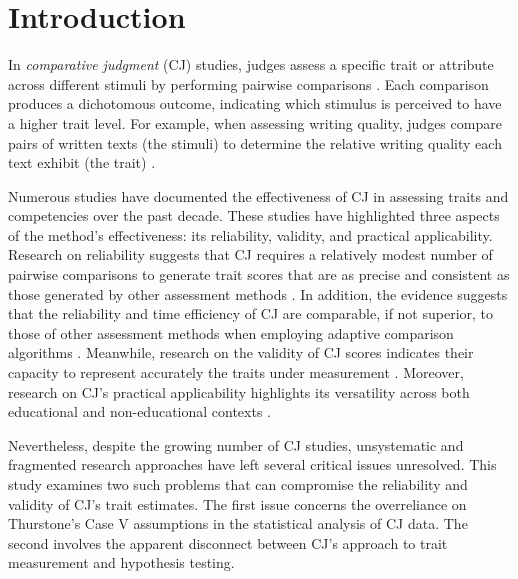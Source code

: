 \documentclass[
  authoryear,
  review,
  1p]{elsarticle}
\begin{document}
\newcommand{\dsep}{\:\bot\:}
\newcommand{\ndsep}{\:\not\bot\:}
\newcommand{\cond}{\:|\:}

\section{Introduction}\label{sec-introduction}

In \emph{comparative judgment} (CJ) studies, judges assess a specific
trait or attribute across different stimuli by performing pairwise
comparisons \citep{Thurstone_1927a, Thurstone_1927b}. Each comparison
produces a dichotomous outcome, indicating which stimulus is perceived
to have a higher trait level. For example, when assessing writing
quality, judges compare pairs of written texts (the stimuli) to
determine the relative writing quality each text exhibit (the trait)
\citep{Laming_2004, Pollitt_2012b, Whitehouse_2012, vanDaal_et_al_2016, Lesterhuis_2018_thesis, Coertjens_et_al_2017, Goossens_et_al_2018, Bouwer_et_al_2023}.

Numerous studies have documented the effectiveness of CJ in assessing
traits and competencies over the past decade. These studies have
highlighted three aspects of the method's effectiveness: its
reliability, validity, and practical applicability. Research on
reliability suggests that CJ requires a relatively modest number of
pairwise comparisons \citep{Verhavert_et_al_2019, Crompvoets_et_al_2022}
to generate trait scores that are as precise and consistent as those
generated by other assessment methods
\citep{Coertjens_et_al_2017, Goossens_et_al_2018, Bouwer_et_al_2023}. In
addition, the evidence suggests that the reliability and time efficiency
of CJ are comparable, if not superior, to those of other assessment
methods when employing adaptive comparison algorithms
\citep{Pollitt_2012b, Verhavert_et_al_2022, Mikhailiuk_et_al_2021}.
Meanwhile, research on the validity of CJ scores indicates their
capacity to represent accurately the traits under measurement
\citep{Whitehouse_2012, vanDaal_et_al_2016, Lesterhuis_2018_thesis, Bartholomew_et_al_2018, Bouwer_et_al_2023}.
Moreover, research on CJ's practical applicability highlights its
versatility across both educational and non-educational contexts
\citep{Kimbell_2012, Jones_et_al_2015, Bartholomew_et_al_2018, Jones_et_al_2019, Marshall_et_al_2020, Bartholomew_et_al_2020, Boonen_et_al_2020}.

Nevertheless, despite the growing number of CJ studies, unsystematic and
fragmented research approaches have left several critical issues
unresolved. This study examines two such problems that can compromise
the reliability and validity of CJ's trait estimates. The first issue
concerns the overreliance on Thurstone's Case V assumptions in the
statistical analysis of CJ data. The second involves the apparent
disconnect between CJ's approach to trait measurement and hypothesis
testing.
\end{document}
